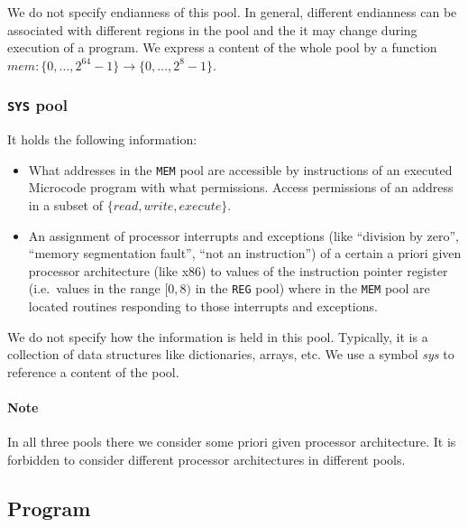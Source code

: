 \documentclass[10pt,twocolumn]{article}
\begin{document}
We do not specify endianness of this pool. In general, different endianness can
be associated with different regions in the pool and the it may change during
execution of a program. We express a content of the whole pool by a function $
\mathit{mem}: \{ 0, \ldots, 2^{64}-1 \} \rightarrow \{ 0, \ldots, 2^{8}-1 \}$.

\subsubsection{\texttt{SYS} pool}
\label{sec:microcode:memory:SYS}

It holds the following information:
\begin{itemize}

\item What addresses in the \texttt{MEM} pool are accessible by instructions of
an executed Microcode program with what permissions. Access permissions of an
address in a subset of $ \{ \mathit{read}, \mathit{write}, \mathit{execute} \}
$.

\item An assignment of processor interrupts and exceptions (like ``division by
zero'', ``memory segmentation fault'', ``not an instruction'') of a certain a
priori given processor architecture (like x86) to values of the instruction
pointer register (i.e.~values in the range $ [0,8) $ in the \texttt{REG} pool)
where in the \texttt{MEM} pool are located routines responding to those
interrupts and exceptions.

\end{itemize}
We do not specify how the information is held in this pool. Typically, it is a
collection of data structures like dictionaries, arrays, etc. We use a symbol
\textit{sys} to reference a content of the pool.

\paragraph{Note} In all three pools there we consider some priori given
processor architecture. It is forbidden to consider different processor
architectures in different pools.

\subsection{Program}
\label{sec:microcode:program}
\end{document}
